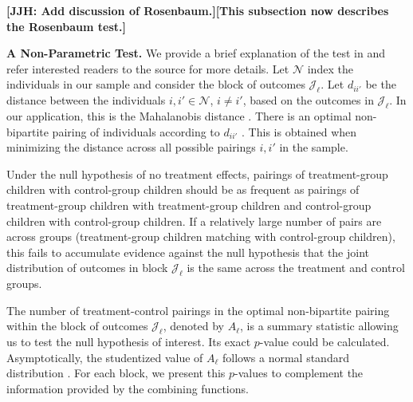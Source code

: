 \textbf{[JJH: Add discussion of Rosenbaum.][This subsection now describes the Rosenbaum test.]}

\textbf{A Non-Parametric Test.} We provide a brief explanation of the test in \citet{Rosenbaum_2005_Distribution_JRSS} and refer interested readers to the source for more details. Let $\mathcal{N}$ index the individuals in our sample and consider the block of outcomes $\mathcal{J}_\ell$. Let $d_{ii'}$ be the distance between the individuals $i, i' \in \mathcal{N}$, $i \neq i'$, based on the outcomes in $\mathcal{J}_\ell$. In our application, this is the Mahalanobis distance \citep{Mahalanobis_1936_PNISI}. There is an optimal non-bipartite pairing of individuals according to $d_{ii'}$ \citep{galil1986efficien}. This is obtained when minimizing the distance across all possible pairings $i, i'$ in the sample. 

Under the null hypothesis of no treatment effects, pairings of treatment-group children with control-group children should be as frequent as pairings of treatment-group children with treatment-group children and control-group children with control-group children. If a relatively large number of pairs are across groups (treatment-group children matching with control-group children), this fails to accumulate evidence against the null hypothesis that the joint distribution of outcomes in block $\mathcal{J}_\ell$ is the same across the treatment and control groups.

The number of treatment-control pairings in the optimal non-bipartite pairing within the block of outcomes $\mathcal{J}_\ell$, denoted by $A_\ell$, is a summary statistic allowing us to test the null hypothesis of interest. Its exact $p$-value could be calculated. Asymptotically, the studentized value of $A_\ell$ follows a normal standard distribution \citep{Rosenbaum_2005_Distribution_JRSS}. For each block, we present this $p$-values to complement the information provided by the combining functions.
